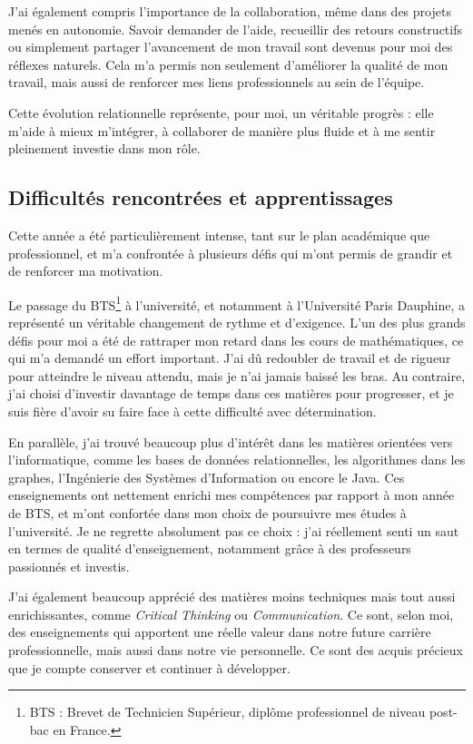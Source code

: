 J’ai également compris l’importance de la collaboration, même dans des projets menés en autonomie. Savoir demander de l’aide, recueillir des retours constructifs ou simplement partager l’avancement de mon travail sont devenus pour moi des réflexes naturels. Cela m’a permis non seulement d’améliorer la qualité de mon travail, mais aussi de renforcer mes liens professionnels au sein de l’équipe.

Cette évolution relationnelle représente, pour moi, un véritable progrès : elle m’aide à mieux m’intégrer, à collaborer de manière plus fluide et à me sentir pleinement investie dans mon rôle.

\subsection{Difficultés rencontrées et apprentissages}

Cette année a été particulièrement intense, tant sur le plan académique que professionnel, et m’a confrontée à plusieurs défis qui m’ont permis de grandir et de renforcer ma motivation.

Le passage du \textsc{BTS\footnote{BTS : Brevet de Technicien Supérieur, diplôme professionnel de niveau post-bac en France.}} à l’université, et notamment à l’Université Paris Dauphine, a représenté un véritable changement de rythme et d’exigence. L’un des plus grands défis pour moi a été de rattraper mon retard dans les cours de mathématiques, ce qui m’a demandé un effort important. J’ai dû redoubler de travail et de rigueur pour atteindre le niveau attendu, mais je n’ai jamais baissé les bras. Au contraire, j’ai choisi d’investir davantage de temps dans ces matières pour progresser, et je suis fière d’avoir su faire face à cette difficulté avec détermination.

En parallèle, j’ai trouvé beaucoup plus d’intérêt dans les matières orientées vers l’informatique, comme les bases de données relationnelles, les algorithmes dans les graphes, l'Ingénierie des Systèmes d’Information ou encore le Java. Ces enseignements ont nettement enrichi mes compétences par rapport à mon année de BTS, et m’ont confortée dans mon choix de poursuivre mes études à l’université. Je ne regrette absolument pas ce choix : j’ai réellement senti un saut en termes de qualité d’enseignement, notamment grâce à des professeurs passionnés et investis.

J’ai également beaucoup apprécié des matières moins techniques mais tout aussi enrichissantes, comme \textit{Critical Thinking} ou \textit{Communication}. Ce sont, selon moi, des enseignements qui apportent une réelle valeur dans notre future carrière professionnelle, mais aussi dans notre vie personnelle. Ce sont des acquis précieux que je compte conserver et continuer à développer.


